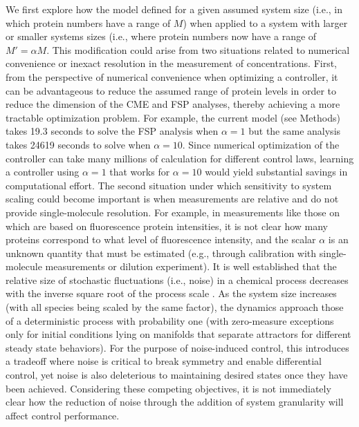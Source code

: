 \documentclass[12pt]{article}
\begin{document}
We first explore how the model defined for a given assumed system size (i.e., in which protein numbers have a range of $M$) when applied to a system with larger or smaller systems sizes (i.e., where protein numbers now have a range of $M' = \alpha M$.  This modification could arise from two situations related to numerical convenience or inexact resolution in the measurement of concentrations. First, from the perspective of numerical convenience when optimizing a controller, it can be advantageous to reduce the assumed range of protein levels in order to reduce the dimension of the CME and FSP analyses, thereby achieving a more tractable optimization problem.  For example, the current model (see Methods) takes 19.3 seconds to solve the FSP analysis when $\alpha=1$ but the same analysis takes 24619 seconds to solve when $\alpha=10$. Since numerical optimization of the controller can take many millions of calculation for different control laws, learning a controller using $\alpha=1$ that works for $\alpha=10$ would yield substantial savings in computational effort. The second situation under which sensitivity to system scaling could become important is when measurements are relative and do not provide single-molecule resolution. For example, in measurements like those on \cite{Baumschlager} which are based on fluorescence protein intensities, it is not clear how many proteins correspond to what level of fluorescence intensity, and the scalar $\alpha$ is an unknown quantity that must be estimated (e.g., through calibration with single-molecule measurements or dilution experiment\cite{XXX - look for elowitz paper or something similar that tried to calibrate for single-molecule counts}). 
It is well established that the relative size of stochastic fluctuations (i.e., noise) in a chemical process decreases with the inverse square root of the process scale \cite{Kampen1961}. As the system size increases (with all species being scaled by the same factor), the dynamics approach those of a deterministic process with probability one (with zero-measure exceptions only for initial conditions lying on manifolds that separate attractors for different steady state behaviors)\cite{XXX}. For the purpose of noise-induced control, this introduces a tradeoff where noise is critical to break symmetry and enable differential control, yet noise is also deleterious to maintaining desired states once they have been achieved. Considering these competing objectives, it is not immediately clear how the reduction of noise through the addition of system granularity will affect control performance. 
\end{document}
